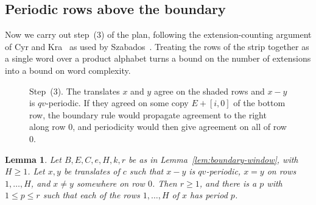 \documentclass[11pt,a4paper,reqno]{amsart}
\newtheorem{lemma}[theorem]{Lemma}
\theoremstyle{definition}
\theoremstyle{remark}
\newcommand{\rc}[2]{[#1,#2]}
\numberwithin{equation}{section}
\begin{document}
\subsection{Periodic rows above the boundary}
Now we carry out step~(3) of the plan, following the extension-counting argument of Cyr and Kra~\cite[Lemma~2.24]{CK} as used by Szabados~\cite[Lemma~4]{Sz}. Treating the rows of the strip together as a single word over a product alphabet turns a bound on the number of extensions into a bound on word complexity.

\begin{figure}[ht]
\centering
{}
\caption{Step~(3). The translates $x$ and $y$ agree on the shaded rows and $x-y$ is $qv$-periodic. If they agreed on some copy $E+\rc i0$ of the bottom row, the boundary rule would propagate agreement to the right along row $0$, and periodicity would then give agreement on all of row $0$.}
\label{fig:strip}
\end{figure}

\begin{lemma}\label{lem:periodic-interior}
Let $B,E,C,e,H,k,r$ be as in Lemma~\ref{lem:boundary-window}, with $H\ge1$. Let $x,y$ be translates of $c$ such that $x-y$ is $qv$-periodic, $x=y$ on rows $1,\ldots,H$, and $x\ne y$ somewhere on row $0$. Then $r\ge1$, and there is a $p$ with $1\le p\le r$ such that each of the rows $1,\ldots,H$ of $x$ has period $p$.
\end{lemma}
\end{document}
